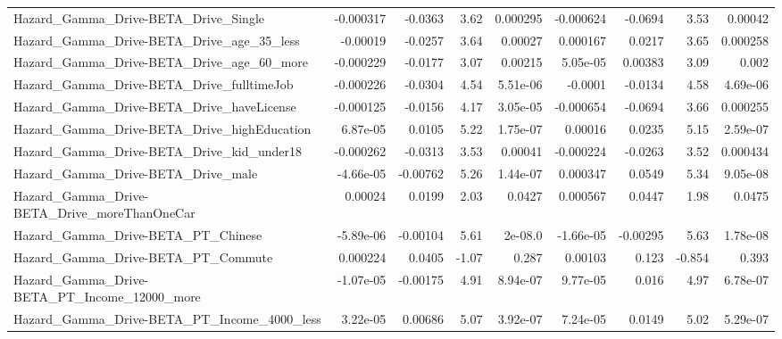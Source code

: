 \begin{tabular}{lrrrrrrrr}
Hazard\_Gamma\_Drive-BETA\_Drive\_Single               &   -0.000317 &      -0.0363 &     3.62 & 0.000295 &  -0.000624 &     -0.0694 &         3.53 &       0.00042 \\
Hazard\_Gamma\_Drive-BETA\_Drive\_age\_35\_less          &    -0.00019 &      -0.0257 &     3.64 &  0.00027 &   0.000167 &      0.0217 &         3.65 &      0.000258 \\
Hazard\_Gamma\_Drive-BETA\_Drive\_age\_60\_more          &   -0.000229 &      -0.0177 &     3.07 &  0.00215 &   5.05e-05 &     0.00383 &         3.09 &         0.002 \\
Hazard\_Gamma\_Drive-BETA\_Drive\_fulltimeJob          &   -0.000226 &      -0.0304 &     4.54 & 5.51e-06 &    -0.0001 &     -0.0134 &         4.58 &      4.69e-06 \\
Hazard\_Gamma\_Drive-BETA\_Drive\_haveLicense          &   -0.000125 &      -0.0156 &     4.17 & 3.05e-05 &  -0.000654 &     -0.0694 &         3.66 &      0.000255 \\
Hazard\_Gamma\_Drive-BETA\_Drive\_highEducation        &    6.87e-05 &       0.0105 &     5.22 & 1.75e-07 &    0.00016 &      0.0235 &         5.15 &      2.59e-07 \\
Hazard\_Gamma\_Drive-BETA\_Drive\_kid\_under18          &   -0.000262 &      -0.0313 &     3.53 &  0.00041 &  -0.000224 &     -0.0263 &         3.52 &      0.000434 \\
Hazard\_Gamma\_Drive-BETA\_Drive\_male                 &   -4.66e-05 &     -0.00762 &     5.26 & 1.44e-07 &   0.000347 &      0.0549 &         5.34 &      9.05e-08 \\
Hazard\_Gamma\_Drive-BETA\_Drive\_moreThanOneCar       &     0.00024 &       0.0199 &     2.03 &   0.0427 &   0.000567 &      0.0447 &         1.98 &        0.0475 \\
Hazard\_Gamma\_Drive-BETA\_PT\_Chinese                 &   -5.89e-06 &     -0.00104 &     5.61 &  2e-08.0 &  -1.66e-05 &    -0.00295 &         5.63 &      1.78e-08 \\
Hazard\_Gamma\_Drive-BETA\_PT\_Commute                 &    0.000224 &       0.0405 &    -1.07 &    0.287 &    0.00103 &       0.123 &       -0.854 &         0.393 \\
Hazard\_Gamma\_Drive-BETA\_PT\_Income\_12000\_more       &   -1.07e-05 &     -0.00175 &     4.91 & 8.94e-07 &   9.77e-05 &       0.016 &         4.97 &      6.78e-07 \\
Hazard\_Gamma\_Drive-BETA\_PT\_Income\_4000\_less        &    3.22e-05 &      0.00686 &     5.07 & 3.92e-07 &   7.24e-05 &      0.0149 &         5.02 &      5.29e-07 \\

\end{tabular}

